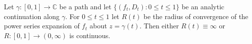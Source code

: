 Let $\gamma: [0, 1] \to \mathbb{C}$ be a path and let $\{(f_t, D_t): 0 \leq t \leq 1\}$ be an analytic continuation along $\gamma$. For $0 \leq t \leq 1$ let $R(t)$ be the radius of convergence of the power series expansion of $f_t$ about $z = \gamma(t)$. Then either $R(t) \equiv \infty$ or $R: [0, 1] \to (0, \infty)$ is continuous.